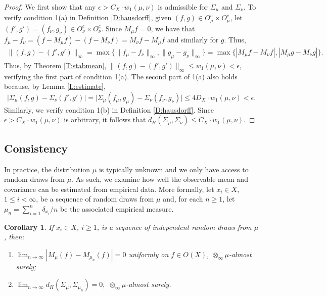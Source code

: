 \documentclass[11pt]{article}
\newtheorem{corollary}[theorem]{Corollary}
\theoremstyle{definition}
\newcommand{\obs}[1]{\ensuremath{O(#1)}}
\newcommand{\cobs}[1]{\ensuremath{O^c_{#1}}}
\begin{document}
\begin{proof}
We first show that any $\epsilon > C_X \cdot w_1 (\mu,\nu)$ is admissible for $\Sigma_\mu$ and $\Sigma_\nu$. To verify condition 1(a) in Definition \ref{D:hausdorff}, given $(f,g) \in \cobs{\mu} \times \cobs{\mu}$, let $(f',g') = (f_\nu, g_\nu) \in \cobs{\nu} \times \cobs{\nu}$. Since $M_\mu f =0$, we have that $f_\mu-f_\nu = (f-M_\mu f) -(f-M_\nu f) = M_\nu f- M_\mu f$ and similarly for $g$. Thus,
\begin{equation}
\begin{split}
\|(f,g)-(f',g')\|_\infty = \max \big\{ \|f_\mu-f_\nu\|_\infty, \|g_\mu -g_\nu\|_\infty \big\}
= \max \big\{ |M_\mu f-M_\nu f|, |M_\mu g-M_\nu g| \big\} .
\end{split}
\end{equation}
Thus, by Theorem \ref{T:stabmean}, $\|(f,g)-(f',g')\|_\infty \leq w_1(\mu,\nu) < \epsilon$, verifying the first part of condition 1(a). The second part of 1(a) also holds because, by Lemma \ref{L:estimate},
\begin{equation}
\big|\Sigma_\mu (f,g) - \Sigma_\nu (f',g')\big| =  \big|\Sigma_\mu (f_\mu,g_\mu) - \Sigma_\nu (f_\nu,g_\nu) \big| 
\leq 4 D_X \cdot w_1 (\mu,\nu) < \epsilon.
\end{equation}
Similarly, we verify condition 1(b) in Definition \ref{D:hausdorff}. Since $\epsilon > C_X \cdot w_1(\mu,\nu)$ is arbitrary, it follows that $d_H(\Sigma_\mu, \Sigma_\nu) \leq C_X \cdot w_1 (\mu,\nu)$.
\end{proof}


\subsection{Consistency} 

In practice, the distribution $\mu$ is typically unknown and we only have access to random draws from $\mu$. As such, we examine how well the observable mean and covariance can be estimated from empirical data. More formally, let $x_i \in X$, $1 \leq i < \infty$, be a sequence of random draws from $\mu$ and, for each $n \geq 1$, let $\mu_n = \sum_{i=1}^n \delta_{x_i}/n$ be the associated empirical measure. 

\begin{corollary}
If $x_i \in X$, $i \geq 1$, is a sequence of independent random draws from $\mu$, then:
\begin{enumerate}[\rm (i)]
\item $\lim_{n \to \infty} |M_\mu (f) - M_{\mu_n}(f)|= 0$ uniformly on $f \in \obs{X}$, ${\otimes_\infty}\mu$-almost surely;
\item $\lim_{n \to \infty} d_H(\Sigma_\mu, \Sigma_{\mu_n}) = 0,$  ${\otimes_\infty}\mu$-almost surely.
\end{enumerate}
\end{corollary}
\end{document}
